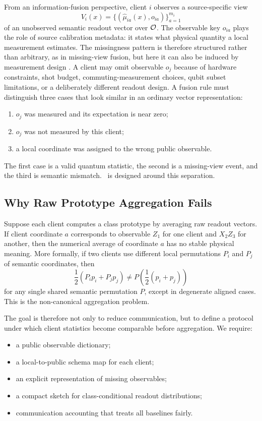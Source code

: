 From an information-fusion perspective, client \(i\) observes a source-specific view
\begin{equation}
    V_i(x)=\{(\hat{\mu}_{ia}(x),o_{ia})\}_{a=1}^{m_i}
\end{equation}
of an unobserved semantic readout vector over \(\mathcal{O}\). The observable key \(o_{ia}\) plays the role of source calibration metadata: it states what physical quantity a local measurement estimates. The missingness pattern is therefore structured rather than arbitrary, as in missing-view fusion, but here it can also be induced by measurement design \cite{havaei2016hemis,tang2024incomplete,huang2020classicalshadows}. A client may omit observable \(o_j\) because of hardware constraints, shot budget, commuting-measurement choices, qubit subset limitations, or a deliberately different readout design. A fusion rule must distinguish three cases that look similar in an ordinary vector representation:
\begin{enumerate}
    \item \(o_j\) was measured and its expectation is near zero;
    \item \(o_j\) was not measured by this client;
    \item a local coordinate was assigned to the wrong public observable.
\end{enumerate}
The first case is a valid quantum statistic, the second is a missing-view event, and the third is semantic mismatch. \method\ is designed around this separation.

\subsection{Why Raw Prototype Aggregation Fails}

Suppose each client computes a class prototype by averaging raw readout vectors. If client coordinate \(a\) corresponds to observable \(Z_1\) for one client and \(X_2Z_3\) for another, then the numerical average of coordinate \(a\) has no stable physical meaning. More formally, if two clients use different local permutations \(P_i\) and \(P_j\) of semantic coordinates, then
\begin{equation}
    \frac{1}{2}(P_i p_i + P_j p_j)
    \neq
    P\left(\frac{1}{2}(p_i+p_j)\right)
\end{equation}
for any single shared semantic permutation \(P\), except in degenerate aligned cases. This is the non-canonical aggregation problem.

The goal is therefore not only to reduce communication, but to define a protocol under which client statistics become comparable before aggregation. We require:
\begin{itemize}
    \item a public observable dictionary;
    \item a local-to-public schema map for each client;
    \item an explicit representation of missing observables;
    \item a compact sketch for class-conditional readout distributions;
    \item communication accounting that treats all baselines fairly.
\end{itemize}

